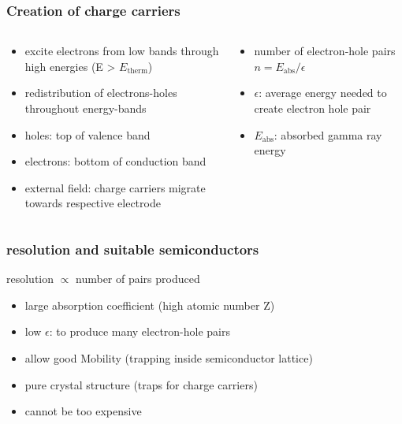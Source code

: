 \documentclass[aspectratio=1610, 12pt]{beamer}
\begin{document}
\begin{frame}\frametitle{Creation of charge carriers}
  \begin{columns}
    \begin{column}[c]{0.48\textwidth}
      \begin{itemize}
        \item excite electrons from low bands through high energies (E > $E_\text{therm}$)
        \item redistribution of electrons-holes throughout energy-bands
        \item holes: top of valence band
        \item electrons: bottom of conduction band
        \item external field: charge carriers migrate towards respective electrode
      \end{itemize}
    \end{column}
    \begin{column}[c]{0.48\textwidth}
      \begin{itemize}
        \item number of electron-hole pairs $n = E_\text{abs} / \epsilon$
        \item $\epsilon$: average energy needed to create electron hole pair
        \item $E_\text{abs}$: absorbed gamma ray energy
      \end{itemize}
    \end{column}
  \end{columns}
\end{frame}

\begin{frame}\frametitle{resolution and suitable semiconductors}
resolution $\propto$ number of pairs produced
  \begin{itemize}
    \item large absorption coefficient (high atomic number Z)
    \item low $\epsilon$: to produce many electron-hole pairs
    \item allow good Mobility (trapping inside semiconductor lattice)
    \item pure crystal structure (traps for charge carriers)
    \item cannot be too expensive
  \end{itemize}
\end{frame}
\end{document}
